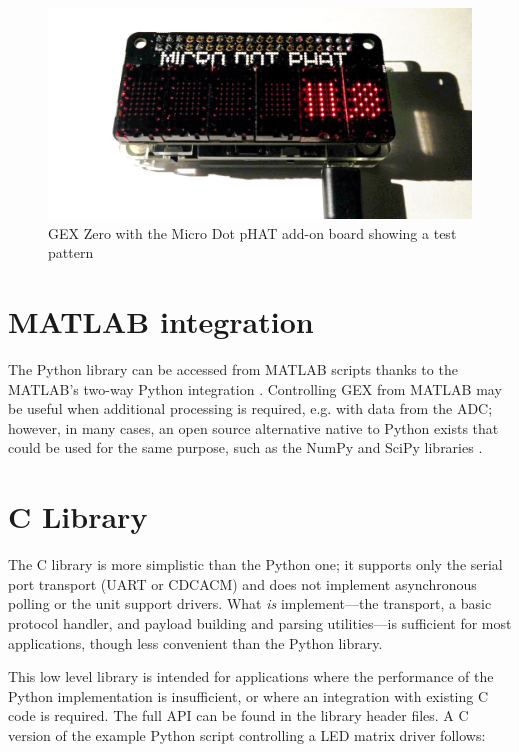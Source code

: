 \begin{figure}[h]
	\centering
	\includegraphics[width=.7\textwidth] {img/phatmtx.jpg}
	\caption{\label{fig:pydemo}GEX Zero with the Micro Dot pHAT add-on board showing a test pattern}
\end{figure}

\section{MATLAB integration}

The Python library can be accessed from MATLAB scripts thanks to the MATLAB's two-way Python integration \cite{matlabpy}. Controlling GEX from MATLAB may be useful when additional processing is required, e.g. with data from the \gls{ADC}; however, in many cases, an open source alternative native to Python exists that could be used for the same purpose, such as the NumPy and SciPy libraries \cite{numpyscipy}.


\section{C Library}

The C library is more simplistic than the Python one; it supports only the serial port transport (\gls{UART} or \gls{CDCACM}) and does not implement asynchronous polling or the unit support drivers. What \textit{is} implement---the transport, a basic protocol handler, and payload building and parsing utilities---is sufficient for most applications, though less convenient than the Python library. 

This low level library is intended for applications where the performance of the Python implementation is insufficient, or where an integration with existing C code is required. The full \gls{API} can be found in the library header files. A C version of the example Python script controlling a \gls{LED} matrix driver follows:









